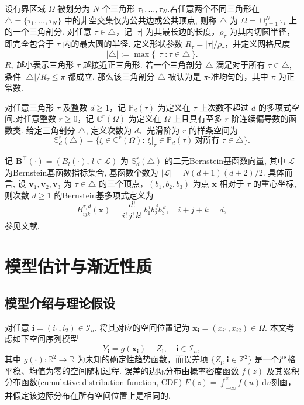 \documentclass[a4paper,openay,14pt]{ctexbook}
\numberwithin{equation}{section}
\numberwithin{lem}{section}
\newcommand{\chapterwithfancyheader}[1]{  
    \chapter{#1} %
    \thispagestyle{fancy} %
}
\begin{document}
设有界区域 $\Omega$ 被划分为 $N$ 个三角形 $\tau_{1},\ldots,\tau_{N}$.若任意两个不同三角形在 $\triangle=\{\tau_{1},\ldots,\tau_{N}\}$ 中的非空交集仅为公共边或公共顶点, 则称 $\triangle$ 为 $\Omega=\cup_{i=1}^N \tau_i$ 上的一个三角剖分. 对任意 $\tau\in\triangle$，记 $|\tau|$ 为其最长边的长度，$\rho_\tau$ 为其内切圆半径，即完全包含于 $\tau$ 内的最大圆的半径. 定义形状参数 $R_\tau=|\tau|/\rho_\tau$，并定义网格尺度
\[
|\triangle|:=\max\{\,|\tau|:\tau\in\triangle\,\}.
\]
$R_\tau$ 越小表示三角形 $\tau$ 越接近正三角形. 若一个三角剖分 \(\triangle\) 满足对于所有 \(\tau \in \triangle\), 条件 \(|\triangle|/R_\tau \leq \pi\) 都成立, 那么该三角剖分 \(\triangle\) 被认为是 \(\pi\)-准均匀的，其中 \(\pi\) 为正常数.

对任意三角形 $\tau$ 及整数 $d\ge 1$，记 $\mathbb{P}_d(\tau)$ 为定义在 $\tau$ 上次数不超过 $d$ 的多项式空间.对任意整数 $r\ge 0$，记 $\mathbb{C}^{r}(\Omega)$ 为定义在 $\Omega$ 上且具有至多 $r$ 阶连续偏导数的函数类. 给定三角剖分 $\triangle$, 定义次数为 $d$、光滑阶为 $r$ 的样条空间为
\begin{equation}\label{DEF:S_rd}
  \mathbb{S}_{d}^{r}(\triangle)
  = \bigl\{\xi\in \mathbb{C}^{r}(\Omega): \ \xi|_{\tau}\in \mathbb{P}_d(\tau)\ \text{对所有 } \tau\in\triangle \bigr\}.
\end{equation}

记 $\mathbf{B}^\top(\boldsymbol{\cdot})=\left(B_{l}(\boldsymbol{\cdot}),\,l\in\mathcal{L}\right)$ 为 $\mathbb{S}_{d}^{r}(\triangle)$ 的二元Bernstein基函数向量, 其中 $\mathcal{L}$ 为Bernstein基函数指标集合, 基函数个数为
$|\mathcal{L}|=N(d+1)(d+2)/2$.
具体而言, 设 $\mathbf{v}_1,\mathbf{v}_2,\mathbf{v}_3$ 为 $\tau\in\triangle$ 的三个顶点，$(b_1,b_2,b_3)$ 为点 $\boldsymbol{x}$ 相对于 $\tau$ 的重心坐标, 则次数 $d\ge 1$ 的Bernstein基多项式定义为
\[
B^{\tau,d}_{ijk}(\boldsymbol{x})
=\frac{d!}{i!\,j!\,k!}\,b_1^{\,i} b_2^{\,j} b_3^{\,k},
\quad i+j+k=d,
\]
参见文献\cite{lai2007spline}. 


\chapterwithfancyheader{模型估计与渐近性质}\label{SEC: result}
\section{模型介绍与理论假设}
对任意 \(\mathbf{i} = (i_1, i_2) \in \mathcal{I}_n\), 将其对应的空间位置记为 \(\boldsymbol{x}_{\mathbf{i}} = (x_{i1}, x_{i2}) \in \Omega\). 本文考虑如下空间序列模型
\begin{equation}\label{model:nonparbiregression}
   Y_{\mathbf{i}} = g(\boldsymbol{x}_{\mathbf{i}}) + Z_{\mathbf{i}}, 
   \quad \mathbf{i} \in \mathcal{I}_n,
\end{equation}
其中 \( g(\cdot): \mathbb{R}^2 \to \mathbb{R} \) 为未知的确定性趋势函数，而误差项
\(\{Z_{\mathbf{i}}, \mathbf{i} \in \mathbb{Z}^2\}\) 是一个严格平稳、均值为零的空间随机过程. 误差的边际分布由概率密度函数 \( f(z) \) 及其累积分布函数(cumulative distribution function, CDF)
\(F(z) = \int_{-\infty}^{z} f(u)\,\mathrm{d}u\)刻画，并假定该边际分布在所有空间位置上是相同的.
\end{document}
